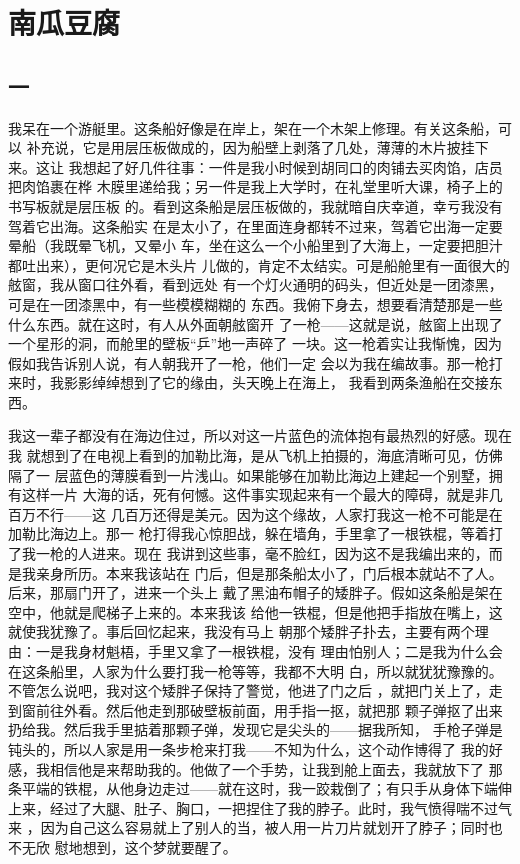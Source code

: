 \chapter{南瓜豆腐}

\section{一}

    我呆在一个游艇里。这条船好像是在岸上，架在一个木架上修理。有关这条船，可以
补充说，它是用层压板做成的，因为船壁上剥落了几处，薄薄的木片披挂下来。这让
我想起了好几件往事：一件是我小时候到胡同口的肉铺去买肉馅，店员把肉馅裹在桦
木膜里递给我；另一件是我上大学时，在礼堂里听大课，椅子上的书写板就是层压板
的。看到这条船是层压板做的，我就暗自庆幸道，幸亏我没有驾着它出海。这条船实
在是太小了，在里面连身都转不过来，驾着它出海一定要晕船（我既晕飞机，又晕小
车，坐在这么一个小船里到了大海上，一定要把胆汁都吐出来），更何况它是木头片
儿做的，肯定不太结实。可是船舱里有一面很大的舷窗，我从窗口往外看，看到远处
有一个灯火通明的码头，但近处是一团漆黑，可是在一团漆黑中，有一些模模糊糊的
东西。我俯下身去，想要看清楚那是一些什么东西。就在这时，有人从外面朝舷窗开
了一枪——这就是说，舷窗上出现了一个星形的洞，而舱里的壁板“乒”地一声碎了
一块。这一枪着实让我惭愧，因为假如我告诉别人说，有人朝我开了一枪，他们一定
会以为我在编故事。那一枪打来时，我影影绰绰想到了它的缘由，头天晚上在海上，
我看到两条渔船在交接东西。

    我这一辈子都没有在海边住过，所以对这一片蓝色的流体抱有最热烈的好感。现在我
就想到了在电视上看到的加勒比海，是从飞机上拍摄的，海底清晰可见，仿佛隔了一
层蓝色的薄膜看到一片浅山。如果能够在加勒比海边上建起一个别墅，拥有这样一片
大海的话，死有何憾。这件事实现起来有一个最大的障碍，就是非几百万不行——这
几百万还得是美元。因为这个缘故，人家打我这一枪不可能是在加勒比海边上。那一
枪打得我心惊胆战，躲在墙角，手里拿了一根铁棍，等着打了我一枪的人进来。现在
我讲到这些事，毫不脸红，因为这不是我编出来的，而是我亲身所历。本来我该站在
门后，但是那条船太小了，门后根本就站不了人。后来，那扇门开了，进来一个头上
戴了黑油布帽子的矮胖子。假如这条船是架在空中，他就是爬梯子上来的。本来我该
给他一铁棍，但是他把手指放在嘴上，这就使我犹豫了。事后回忆起来，我没有马上
朝那个矮胖子扑去，主要有两个理由：一是我身材魁梧，手里又拿了一根铁棍，没有
理由怕别人；二是我为什么会在这条船里，人家为什么要打我一枪等等，我都不大明
白，所以就犹犹豫豫的。不管怎么说吧，我对这个矮胖子保持了警觉，他进了门之后
，就把门关上了，走到窗前往外看。然后他走到那破壁板前面，用手指一抠，就把那
颗子弹抠了出来扔给我。然后我手里掂着那颗子弹，发现它是尖头的——据我所知，
手枪子弹是钝头的，所以人家是用一条步枪来打我——不知为什么，这个动作博得了
我的好感，我相信他是来帮助我的。他做了一个手势，让我到舱上面去，我就放下了
那条平端的铁棍，从他身边走过——就在这时，我一跤栽倒了；有只手从身体下端伸
上来，经过了大腿、肚子、胸口，一把捏住了我的脖子。此时，我气愤得喘不过气来
，因为自己这么容易就上了别人的当，被人用一片刀片就划开了脖子；同时也不无欣
慰地想到，这个梦就要醒了。

